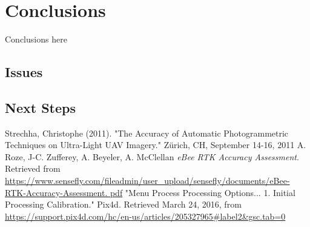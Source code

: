 \documentclass{article}
\begin{document}
\section{Conclusions}
Conclusions here
\subsection{Issues}
\subsection{Next Steps}
\begin{thebibliography}{9}
Strechha,  Christophe (2011). "The Accuracy of Automatic Photogrammetric Techniques on Ultra-Light 
UAV Imagery."  Zürich, CH, September 
14-16, 2011
A. Roze, J-C. Zufferey, A. Beyeler, A. McClellan \textit{eBee RTK Accuracy Assessment}.
Retrieved from 
\url{https://www.sensefly.com/fileadmin/user_upload/sensefly/documents/eBee-RTK-Accuracy-Assessment.
pdf}
"Menu Process Processing Options... 1. Initial Processing Calibration." Pix4d. Retrieved March 24, 
2016, from \url{https://support.pix4d.com/hc/en-us/articles/205327965#label2&gsc.tab=0}
\end{thebibliography}
\thispagestyle{lastpage}
\end{document}
